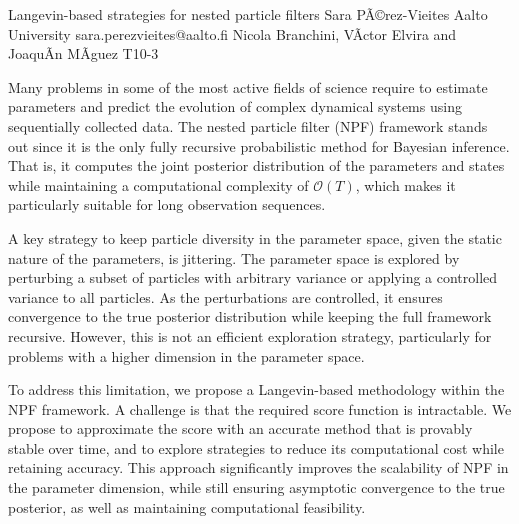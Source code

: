 \begin{talk}
  {Langevin-based strategies for nested particle filters}%
  {Sara PÃ©rez-Vieites}%
  {Aalto University}%
  {sara.perezvieites@aalto.fi}%
  {Nicola Branchini, VÃ­ctor Elvira and JoaquÃ­n MÃ­guez}%
  {T10-3}%
			
Many problems in some of the most active fields of science require to estimate parameters and predict the evolution of complex dynamical systems using sequentially collected data. The nested particle filter (NPF) framework stands out since it is the only fully recursive probabilistic method for Bayesian inference. That is, it computes the joint posterior distribution of the parameters and states while maintaining a computational complexity of $\mathcal{O}(T)$, which makes it particularly suitable for long observation sequences. 

A key strategy to keep particle diversity in the parameter space, given the static nature of the parameters, is jittering. The parameter space is explored by perturbing a subset of particles with arbitrary variance or applying a controlled variance to all particles. As the perturbations are controlled, it ensures convergence to the true posterior distribution while keeping the full framework recursive. However, this is not an efficient exploration strategy, particularly for problems with a higher dimension in the parameter space.

To address this limitation, we propose a Langevin-based methodology within the NPF framework. A challenge is that the required score function is intractable. We propose to approximate the score with an accurate method that is provably stable over time, and to explore strategies to reduce its computational cost while retaining accuracy.
This approach significantly improves the scalability of NPF in the parameter dimension, while still ensuring asymptotic convergence to the true posterior, as well as maintaining computational feasibility.

\medskip




\end{talk}
